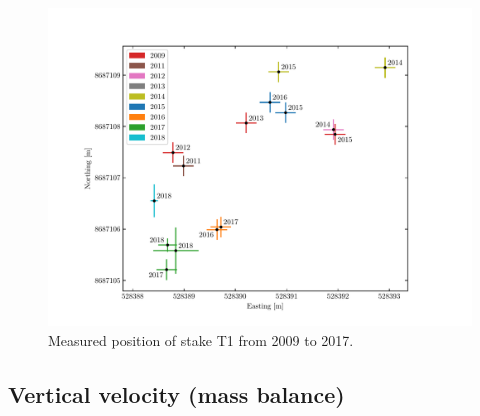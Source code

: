 \begin{figure}[H]
    \centering
    \includegraphics[width=\textwidth]{./figs/T1_2d.pdf}
    \caption{Measured position of stake T1 from 2009 to 2017.}
    \label{GF:fig:T1_2d}
\end{figure}


\subsection{Vertical velocity (mass balance)}